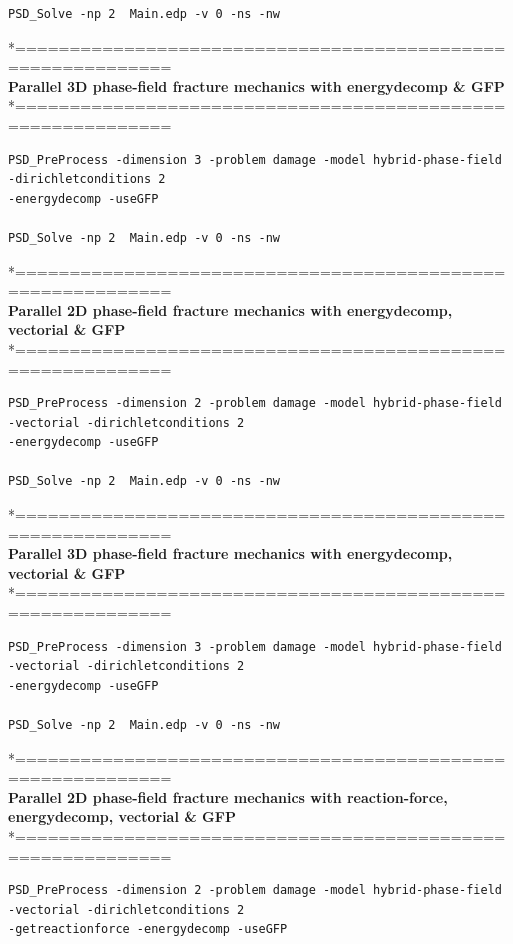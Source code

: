 {{\begin{lstlisting}[style=Linux]
PSD_Solve -np 2  Main.edp -v 0 -ns -nw   
\end{lstlisting}
*============================================================\\
\textbf{ Parallel 3D phase-field fracture mechanics with energydecomp \& GFP} \\
*============================================================\\
\begin{lstlisting}[style=Linux]
PSD_PreProcess -dimension 3 -problem damage -model hybrid-phase-field -dirichletconditions 2
-energydecomp -useGFP   

PSD_Solve -np 2  Main.edp -v 0 -ns -nw   	
\end{lstlisting}
*============================================================\\
 \textbf{Parallel 2D phase-field fracture mechanics with energydecomp, vectorial \& GFP} \\
*============================================================\\
\begin{lstlisting}[style=Linux]
PSD_PreProcess -dimension 2 -problem damage -model hybrid-phase-field -vectorial -dirichletconditions 2 
-energydecomp -useGFP  

PSD_Solve -np 2  Main.edp -v 0 -ns -nw   
\end{lstlisting}
*============================================================\\
\textbf{ Parallel 3D phase-field fracture mechanics with energydecomp, vectorial \& GFP} \\
*============================================================\\
\begin{lstlisting}[style=Linux]
PSD_PreProcess -dimension 3 -problem damage -model hybrid-phase-field -vectorial -dirichletconditions 2
-energydecomp -useGFP   

PSD_Solve -np 2  Main.edp -v 0 -ns -nw   	
\end{lstlisting}
*============================================================\\
 \textbf{Parallel 2D phase-field fracture mechanics with reaction-force, energydecomp, vectorial \& GFP} \\
*============================================================\\
\begin{lstlisting}[style=Linux]
PSD_PreProcess -dimension 2 -problem damage -model hybrid-phase-field -vectorial -dirichletconditions 2 
-getreactionforce -energydecomp -useGFP  


\end{lstlisting}}}
